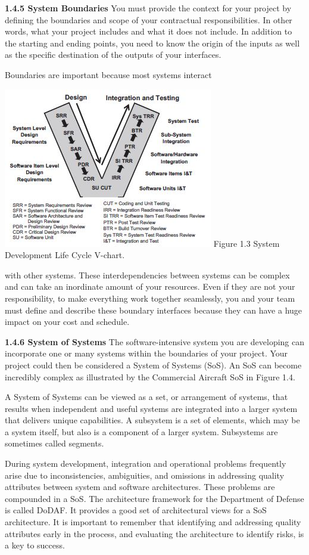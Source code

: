 \documentclass{book}
\begin{document}
\begin{multicols}{2}
\textbf{1.4.5 System Boundaries}
You must provide the context for your project by defining the
boundaries and scope of your contractual responsibilities. In
other words, what your project includes and what it does not
include. In addition to the starting and ending points, you
need to know the origin of the inputs as well as the specific
destination of the outputs of your interfaces.

Boundaries are important because most systems interact


\includegraphics{Figure1.3}
 Figure 1.3 System Development Life Cycle V-chart.

with other systems. These interdependencies between systems  
can be complex and can take an inordinate amount of your
resources. Even if they are not your responsibility, to make
everything work together seamlessly, you and your team
must define and describe these boundary interfaces because
they can have a huge impact on your cost and schedule.

\textbf{1.4.6 System of Systems}
The software-intensive system you are developing can incorporate one or many systems within the boundaries of your
project. Your project could then be considered a System of
Systems (SoS). An SoS can become incredibly complex as
illustrated by the Commercial Aircraft SoS in Figure 1.4.

A System of Systems can be viewed as a set, or arrangement of systems, that results when independent and useful systems are integrated into a larger system that delivers
unique capabilities. A subsystem is a set of elements, which
may be a system itself, but also is a component of a larger system. Subsystems are sometimes called segments.

During system development, integration and operational
problems frequently arise due to inconsistencies, ambiguities, and omissions in addressing quality attributes between
system and software architectures. These problems are
compounded in a SoS. The architecture framework for the
Department of Defense is called DoDAF. It provides a good
set of architectural views for a SoS architecture. It is important to remember that identifying and addressing quality
attributes early in the process, and evaluating the architecture to identify risks, is a key to success.


\end{multicols}
\end{document}
